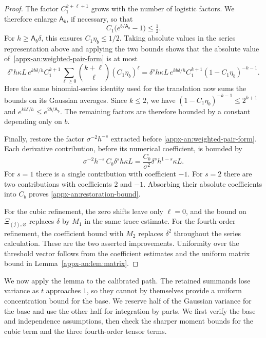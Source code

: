 \documentclass[11pt,letterpaper]{article}
\theoremstyle{remark}
\begin{document}
\begin{proof}
The factor $C_1^{k+\ell+1}$ grows with the number of logistic
factors. We therefore enlarge $\mathsf A_b$, if necessary, so that
\[
 C_1\bigl(e^{b/\mathsf A_b}-1\bigr)\le\tfrac12.
\]
For $h\ge\mathsf A_b\delta$, this ensures
$C_1\eta_b\le1/2$. Taking absolute values in the series
representation above and applying the two bounds shows that the
absolute value of~\eqref{appx-an:weighted-pair-form} is at most
\[
 \delta^s h\kappa L\,e^{kb\delta/h}C_1^{k+1}
 \sum_{\ell\ge0}\binom{k+\ell}{\ell}(C_1\eta_b)^\ell
 =\delta^s h\kappa L\,e^{kb\delta/h}C_1^{k+1}
       (1-C_1\eta_b)^{-k-1}.
\]
Here the same binomial-series identity used for the translation
now sums the bounds on its Gaussian averages. Since $k\le2$,
we have $(1-C_1\eta_b)^{-k-1}\le2^{k+1}$ and
$e^{kb\delta/h}\le e^{2b/\mathsf A_b}$. The remaining factors
are therefore bounded by a constant depending only on $b$.

Finally, restore the factor $\sigma^{-2}h^{-s}$ extracted before
\eqref{appx-an:weighted-pair-form}. Each derivative contribution,
before its numerical coefficient, is bounded by
\[
 \sigma^{-2}h^{-s}\,C_b\delta^s h\kappa L
 =\frac{C_b}{\sigma^2}\delta^s h^{1-s}\kappa L.
\]
For $s=1$ there is a single contribution with coefficient $-1$.
For $s=2$ there are two contributions with coefficients $2$ and
$-1$. Absorbing their absolute coefficients into $C_b$ proves
\eqref{appx-an:restoration-bound}.

For the cubic refinement, the zero shifts leave only $\ell=0$,
and the bound on $\Xi_{(j),\varnothing}$ replaces $\delta$ by
$M_1$ in the same trace estimate. For the fourth-order
refinement, the coefficient bound with $M_2$ replaces $\delta^2$
throughout the series calculation. These are the two asserted
improvements. Uniformity over the threshold vector follows from
the coefficient estimates and the uniform matrix bound in
Lemma~\ref{appx-an:lem:matrix}.
\end{proof}

We now apply the lemma to the calibrated path. The retained
summands lose variance as $t$ approaches $1$, so they cannot by
themselves provide a uniform concentration bound for the base.
We reserve half of the Gaussian variance for the base and use
the other half for integration by parts. We first verify the
base and independence assumptions, then check the sharper moment
bounds for the cubic term and the three fourth-order tensor terms.
\end{document}

